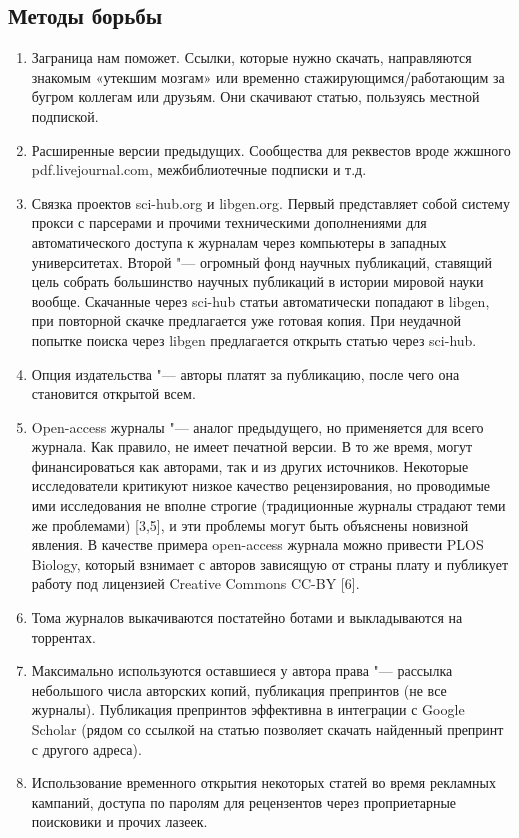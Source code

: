 \documentclass [10pt, a5paper]{article}
\begin{document}
\subsection*{Методы борьбы}

\begin{enumerate}
  \item Заграница нам поможет. Ссылки, которые нужно скачать, направляются знакомым «утекшим мозгам» или временно стажирующимся/работающим за бугром коллегам или друзьям. Они скачивают статью, пользуясь местной подпиской.
  \item Расширенные версии предыдущих. Сообщества для реквестов вроде жжшного pdf.livejournal.com, межбиблиотечные подписки и т.д.
  \item Связка проектов sci-hub.org и libgen.org. Первый представляет собой систему прокси с парсерами и прочими техническими дополнениями для автоматического доступа к журналам через компьютеры в западных университетах. Второй "--- огромный фонд научных публикаций, ставящий цель собрать большинство научных публикаций в истории мировой науки вообще. Скачанные через sci-hub статьи автоматически попадают в libgen, при повторной скачке предлагается уже готовая копия. При неудачной попытке поиска через libgen предлагается открыть статью через sci-hub.
  \item Опция издательства "--- авторы платят за публикацию, после чего она становится открытой всем.
  \item Open-access журналы "--- аналог предыдущего, но применяется для всего журнала. Как правило, не имеет печатной версии. В то же время, могут финансироваться как авторами, так и из других источников. Некоторые исследователи критикуют низкое качество рецензирования, но проводимые ими исследования не вполне строгие (традиционные журналы страдают теми же проблемами) [3,5], и эти проблемы могут быть объяснены новизной явления. В качестве примера open-access журнала можно привести PLOS Biology, который взнимает с авторов зависящую от страны плату и публикует работу под лицензией Creative Commons CC-BY [6].
  \item Тома журналов выкачиваются постатейно ботами и выкладываются на торрентах.
  \item Максимально используются оставшиеся у автора права "--- рассылка небольшого числа авторских копий, публикация препринтов (не все журналы). Публикация препринтов эффективна в интеграции с Google Scholar (рядом со ссылкой на статью позволяет скачать найденный препринт с другого адреса).
  \item Использование временного открытия некоторых статей во время рекламных кампаний, доступа по паролям для рецензентов через проприетарные поисковики и прочих лазеек.
\end{enumerate}
\end{document}
